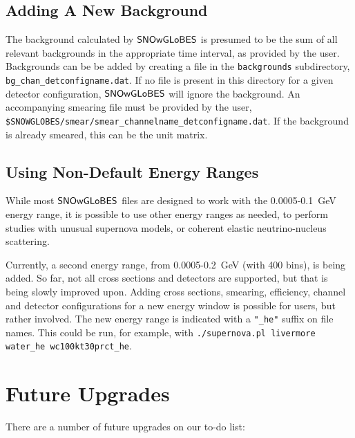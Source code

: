 \documentclass[12pt]{article}
\newcommand{\snowglobes}{\sf{SNOwGLoBES}}
\begin{document}
\subsection{Adding A New Background}

The background calculated by $\snowglobes$ is presumed to be the sum of all relevant backgrounds in the appropriate time interval, as provided by the user.  Backgrounds can be
be added by creating a file in the \texttt{backgrounds} subdirectory,
\texttt{bg\_chan\_detconfigname.dat}.
If no file is present in this directory for a given detector configuration, $\snowglobes$ will ignore the background.
An accompanying smearing file must be provided by the user,\\
\texttt{\$SNOWGLOBES/smear/smear\_channelname\_detconfigname.dat}.
If the background is already smeared, this can be the unit matrix.

\subsection{Using Non-Default Energy Ranges}

While most $\snowglobes$ files are designed to work with the 0.0005-0.1~GeV energy
range, it is possible to use other energy ranges as needed, to perform studies with
unusual supernova models, or coherent elastic neutrino-nucleus scattering.

Currently, a second energy range, from 0.0005-0.2~GeV (with 400 bins), is being added.  So far,
not all cross sections and detectors are supported, but that is being slowly improved upon.
Adding cross sections, smearing, efficiency, channel and detector configurations for
a new energy window is possible for users, but rather involved.  The new energy
range is indicated with a \texttt{"\_he"} suffix on file names.  This could be run,
for example, with \texttt{./supernova.pl livermore water\_he wc100kt30prct\_he}.

\section{Future Upgrades}

There are a number of future upgrades on our to-do list:
\end{document}
